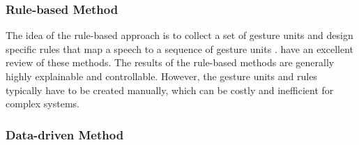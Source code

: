 \subsubsection{Rule-based Method}
The idea of the rule-based approach is to collect a set of gesture units and design specific rules that map a speech to a sequence of gesture units \cite{Kipp2004_Gesture, huang2012robot, softbank2018naoqi, cassell2004beat}. \citet{wagner2014gesture} have an excellent review of these methods. The results of the rule-based methods are generally highly explainable and controllable. However, the gesture units and rules typically have to be created manually, which can be costly and inefficient for complex systems.

\subsubsection{Data-driven Method}
